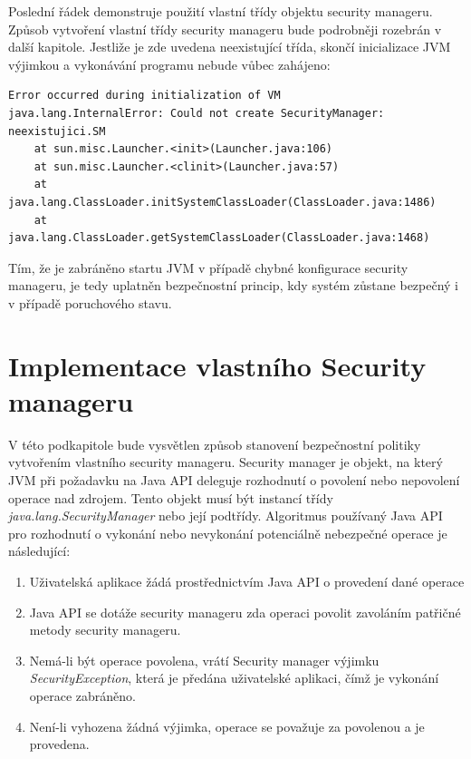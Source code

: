Poslední řádek demonstruje použití vlastní třídy objektu security manageru. Způsob vytvoření vlastní třídy security manageru bude podrobněji rozebrán v další kapitole. Jestliže je zde uvedena neexistující třída, skončí inicializace JVM výjimkou a vykonávání programu nebude vůbec zahájeno:

\begin{verbatim}
Error occurred during initialization of VM
java.lang.InternalError: Could not create SecurityManager: neexistujici.SM
    at sun.misc.Launcher.<init>(Launcher.java:106)
    at sun.misc.Launcher.<clinit>(Launcher.java:57)
    at java.lang.ClassLoader.initSystemClassLoader(ClassLoader.java:1486)
    at java.lang.ClassLoader.getSystemClassLoader(ClassLoader.java:1468)
\end{verbatim}

Tím, že je zabráněno startu JVM v případě chybné konfigurace security manageru, je tedy uplatněn bezpečnostní princip, kdy systém zůstane bezpečný i v případě poruchového stavu.

\section{Implementace vlastního Security manageru}

V této podkapitole bude vysvětlen způsob stanovení bezpečnostní politiky vytvořením vlastního security manageru.
Security manager je objekt, na který JVM při požadavku na Java API deleguje rozhodnutí o povolení nebo nepovolení operace nad zdrojem.
Tento objekt musí být instancí třídy {\it java.lang.SecurityManager} nebo její podtřídy. \cite{tutorialsTSM}
Algoritmus používaný Java API pro rozhodnutí o vykonání nebo nevykonání potenciálně nebezpečné operace je následující: \cite[4.1.1]{oaks}

\begin{enumerate}
  \item Uživatelská aplikace žádá prostřednictvím Java API o provedení dané operace
  \item Java API se dotáže security manageru zda operaci povolit zavoláním patřičné metody security manageru.
  \item Nemá-li být operace povolena, vrátí Security manager výjimku {\it SecurityException}, která je předána uživatelské aplikaci, čímž je vykonání operace zabráněno.
  \item Není-li vyhozena žádná výjimka, operace se považuje za povolenou a je provedena.
\end{enumerate}

